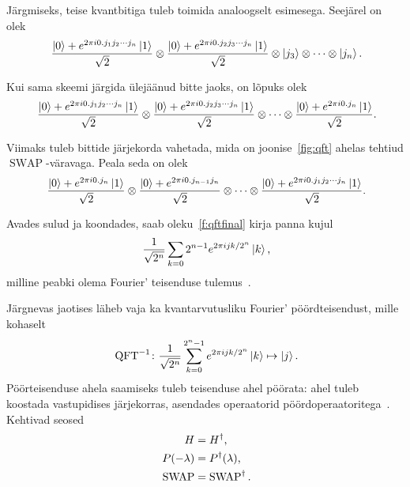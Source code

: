 \documentclass[12pt]{report}
\def\ket#1{\mathinner{|#1\rangle}}
\def\SWAP{\mathop{\mathrm{SWAP}}\nolimits}
\def\QFT{\mathop{\mathrm{QFT}}\nolimits}
\begin{document}
Järgmiseks, teise kvantbitiga tuleb toimida analoogselt esimesega.
Seejärel on olek
\begin{align}
    \frac{\ket{0} + e^{2\pi i0.j_1j_2\cdots j_n}\ket{1}}{\sqrt{2}}
    \otimes \frac{\ket{0} + e^{2\pi i0.j_2j_3\cdots j_n}\ket{1}}{\sqrt{2}}
    \otimes \ket{j_3} \otimes \cdots \otimes \ket{j_n} \rlap{.}
\end{align}

Kui sama skeemi järgida ülejäänud bitte jaoks, on lõpuks olek
\begin{align}
    \frac{\ket{0} + e^{2\pi i0.j_1j_2\cdots j_n}\ket{1}}{\sqrt{2}}
    \otimes \frac{\ket{0} + e^{2\pi i0.j_2j_3\cdots j_n}\ket{1}}{\sqrt{2}}
    \otimes \cdots
    \otimes \frac{\ket{0} + e^{2\pi i0.j_n}\ket{1}}{\sqrt{2}} \rlap{.}
\end{align}

Viimaks tuleb bittide järjekorda vahetada, mida on joonise~\ref{fig:qft} ahelas tehtiud \(\SWAP\)-väravaga.
Peala seda on olek
\begin{align}\label{f:qftfinal}
    \frac{\ket{0} + e^{2\pi i0.j_n}\ket{1}}{\sqrt{2}}
    \otimes \frac{\ket{0} + e^{2\pi i0.j_{n-1}j_n}}{\sqrt{2}}
    \otimes \cdots
    \otimes \frac{\ket{0} + e^{2\pi i0.j_1j_2\cdots j_n}\ket{1}}{\sqrt{2}} \rlap{.}
\end{align}

Avades sulud ja koondades, saab oleku~\ref{f:qftfinal} kirja panna kujul
\begin{equation}\label{f:qftfinaltrans}
    \frac{1}{\sqrt{2^n}}\sum_{k=0}2^{n-1}e^{2\pi ijk/2^n}\ket k \rlap{,}
\end{equation}
milline peabki olema Fourier' teisenduse tulemus~\cite{nielsen+chuang, kaye+laflamme+mosca}.

Järgnevas jaotises läheb vaja ka kvantarvutusliku Fourier' pöördteisendust, mille kohaselt
\begin{align}
    \QFT^{-1}\colon
    \frac{1}{\sqrt{2^n}} \sum_{k=0}^{2^n-1} e^{2\pi ijk/2^n} \ket{k} \mapsto \ket{j} \rlap{.}
\end{align}
Pöörteisenduse ahela saamiseks tuleb teisenduse ahel pöörata: ahel tuleb koostada vastupidises järjekorras, asendades operaatorid pöördoperaatoritega~\cite{kaye+laflamme+mosca}.
Kehtivad seosed
\begin{align}\label{f:iqftdef}
    H &= H^{\dagger} \rlap{,} \\
    P(-\lambda) &= P^{\dagger}(\lambda) \rlap{,} \\
    \SWAP &= \SWAP^{\dagger} \rlap{.}
\end{align}
\end{document}
